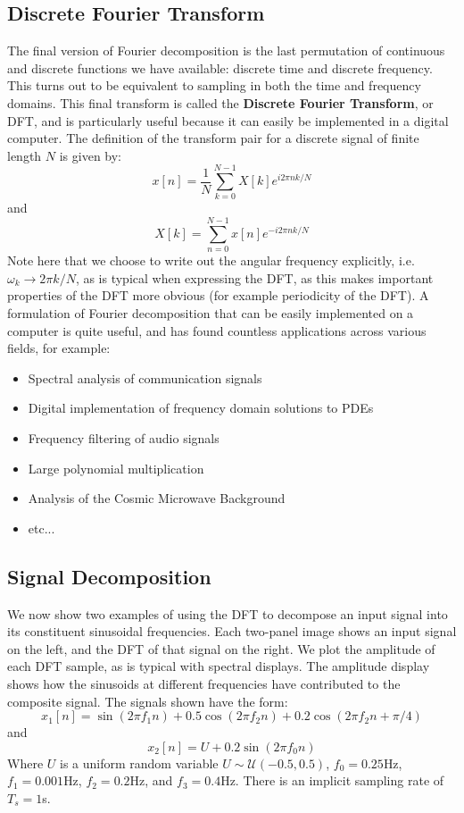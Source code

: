 \subsection{Discrete Fourier Transform}
The final version of Fourier decomposition is the last permutation of continuous and discrete functions we have available: discrete time and discrete frequency. This turns out to be equivalent to sampling in both the time and frequency domains. This final transform is called the \textbf{Discrete Fourier Transform}, or DFT, and is particularly useful because it can easily be implemented in a digital computer. The definition of the transform pair for a discrete signal of finite length $N$ is given by:
\[
x[n] = \dfrac{1}{N}\sum_{k=0}^{N-1}X[k]e^{i2\pi n k /N}
\]
and
\[
X[k] = \sum_{n=0}^{N-1}x[n]e^{-i2\pi n k /N}
\]
Note here that we choose to write out the angular frequency explicitly, i.e. $\omega_k \rightarrow 2\pi k/N$, as is typical when expressing the DFT, as this makes important properties of the DFT more obvious (for example periodicity of the DFT). A formulation of Fourier decomposition that can be easily implemented on a computer is quite useful, and has found countless applications across various fields, for example:
\begin{itemize}
    \item Spectral analysis of communication signals
    \item Digital implementation of frequency domain solutions to PDEs
    \item Frequency filtering of audio signals
    \item Large polynomial multiplication
    \item Analysis of the Cosmic Microwave Background
    \item etc...
\end{itemize}

\pagebreak
\subsection{Signal Decomposition}
We now show two examples of using the DFT to decompose an input signal into its constituent sinusoidal frequencies. Each two-panel image shows an input signal on the left, and the DFT of that signal on the right. We plot the amplitude of each DFT sample, as is typical with spectral displays. The amplitude display shows how the sinusoids at different frequencies have contributed to the composite signal. The signals shown have the form:
\[
x_1[n] = \sin(2\pi f_1 n) + 0.5\cos(2\pi f_2 n) +  0.2\cos(2\pi f_2 n + \pi/4)
\]
and
\[
x_2[n] = U +  0.2\sin(2\pi f_0 n)
\]
Where $U$ is a uniform random variable $U\sim \mathcal{U}(-0.5, 0.5)$, $f_0 = 0.25$Hz, $f_1=0.001$Hz, $f_2=0.2$Hz, and $f_3=0.4$Hz. There is an implicit sampling rate of $T_s = 1$s.

